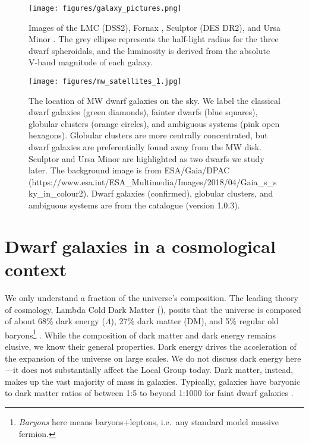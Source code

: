 \begin{figure}
\centering
\texttt{[image: figures/galaxy\_pictures.png]}
\caption[Dwarf Galaxy Pictures]{Images of the LMC (DSS2), Fornax
\citep[DES DR2,][]{abbott+2021}, Sculptor (DES DR2), and Ursa Minor
\citep[UNWISE,][with \textit{Gaia} point sources
over-plotted]{lang2014, meisner+lang+schlegel2017, meisner+lang+schlegel2017a}.
The grey ellipse represents the half-light radius for the three dwarf
spheroidals, and the luminosity is derived from the absolute V-band
magnitude of each galaxy.}\label{fig:galaxy_images}
\end{figure}

\begin{figure}
\centering
\texttt{[image: figures/mw\_satellites\_1.jpg]}
\caption[Dwarf galaxies sky position]{The location of MW dwarf galaxies
on the sky. We label the classical dwarf galaxies (green diamonds),
fainter dwarfs (blue squares), globular clusters (orange circles), and
ambiguous systems (pink open hexagons). Globular clusters are more
centrally concentrated, but dwarf galaxies are preferentially found away
from the MW disk. Sculptor and Ursa Minor are highlighted as two dwarfs
we study later. The background image is from ESA/Gaia/DPAC
(https://www.esa.int/ESA\_Multimedia/Images/2018/04/Gaia\_s\_sky\_in\_colour2).
Dwarf galaxies (confirmed), globular clusters, and ambiguous systems are
from the \citet{pace2024} catalogue (version
1.0.3).}\label{fig:mw_satellite_system}
\end{figure}

\section{Dwarf galaxies in a cosmological
context}\label{dwarf-galaxies-in-a-cosmological-context}

We only understand a fraction of the universe's composition. The leading
theory of cosmology, Lambda Cold Dark Matter (\LCDM{}), posits that the
universe is composed of about 68\% dark energy (\(\Lambda\)), 27\% dark
matter (DM), and 5\% regular old baryons\footnote{\emph{Baryons} here
  means baryons+leptons, i.e.~any standard model massive fermion.}
\citep{planckcollaboration+2020}. While the composition of dark matter
and dark energy remains elusive, we know their general properties. Dark
energy drives the acceleration of the expansion of the universe on large
scales. We do not discuss dark energy here---it does not substantially
affect the Local Group today. Dark matter, instead, makes up the vast
majority of mass in galaxies. Typically, galaxies have baryonic to dark
matter ratios of between 1:5 to beyond 1:1000 for faint dwarf galaxies
\citep[e.g.,][]{hayashi+2023}.

